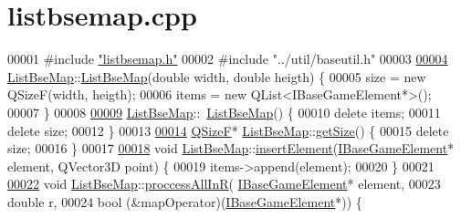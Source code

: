 \hypertarget{a00062_source}{}\section{listbsemap.\+cpp}
\label{a00062_source}

\begin{DoxyCode}
00001 \textcolor{preprocessor}{#}\textcolor{preprocessor}{include} \hyperlink{a00065}{"listbsemap.h"}
00002 \textcolor{preprocessor}{#}\textcolor{preprocessor}{include} \textcolor{preprocessor}{"../util/baseutil.h"}
00003 
\hyperlink{a00169_aa9b6a13fa97af5ed567966cb8a1bc55f}{00004} \hyperlink{a00169_a72a6386e492d05685e86f7fb858e3b32}{ListBseMap}::\hyperlink{a00169_aa9b6a13fa97af5ed567966cb8a1bc55f}{ListBseMap}(\textcolor{keywordtype}{double} width, \textcolor{keywordtype}{double} heigth) \{
00005   size = \textcolor{keyword}{new} QSizeF(width, heigth);
00006   items = \textcolor{keyword}{new} QList<IBaseGameElement*>();
00007 \}
00008 
\hyperlink{a00169_a186089a0e91ae5e4d2c76ab03b240842}{00009} \hyperlink{a00169_a72a6386e492d05685e86f7fb858e3b32}{ListBseMap}::~\hyperlink{a00169_a186089a0e91ae5e4d2c76ab03b240842}{ListBseMap}() \{
00010   \textcolor{keyword}{delete} items;
00011   \textcolor{keyword}{delete} size;
00012 \}
00013 
\hyperlink{a00169_ae58cec494eba5e73b55bfb2f68fc3b52}{00014} \hyperlink{a00169_ae58cec494eba5e73b55bfb2f68fc3b52}{QSizeF}* \hyperlink{a00169_a72a6386e492d05685e86f7fb858e3b32}{ListBseMap}::\hyperlink{a00169_ae58cec494eba5e73b55bfb2f68fc3b52}{getSize}() \{
00015   \textcolor{keyword}{delete} size;
00016 \}
00017 
\hyperlink{a00169_a7aeae2bf692effb329f9a34604a6c286}{00018} \textcolor{keywordtype}{void} \hyperlink{a00169_a72a6386e492d05685e86f7fb858e3b32}{ListBseMap}::\hyperlink{a00169_a7aeae2bf692effb329f9a34604a6c286}{insertElement}(\hyperlink{a00137_ae2be75da1a2a9edfabe993770e24654a}{IBaseGameElement}* element, 
      QVector3D point) \{
00019   items->append(element);
00020 \}
00021 
\hyperlink{a00169_a634c821cf280b64eb56ceac190635b1a}{00022} \textcolor{keywordtype}{void} \hyperlink{a00169_a72a6386e492d05685e86f7fb858e3b32}{ListBseMap}::\hyperlink{a00169_a634c821cf280b64eb56ceac190635b1a}{proccessAllInR}(
      \hyperlink{a00137_ae2be75da1a2a9edfabe993770e24654a}{IBaseGameElement}* element,
00023                                 \textcolor{keywordtype}{double} r,
00024                                 \textcolor{keywordtype}{bool} (&mapOperator)(\hyperlink{a00137_ae2be75da1a2a9edfabe993770e24654a}{IBaseGameElement}*)) \{

\end{DoxyCode}
